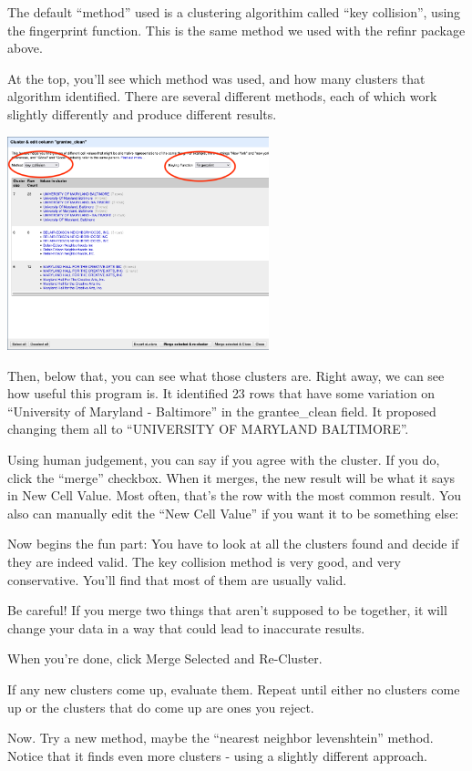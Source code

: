 \documentclass[
  letterpaper,
  DIV=11,
  numbers=noendperiod]{scrreprt}
\begin{document}
The default ``method'' used is a clustering algorithim called ``key
collision'', using the fingerprint function. This is the same method we
used with the refinr package above.

At the top, you'll see which method was used, and how many clusters that
algorithm identified. There are several different methods, each of which
work slightly differently and produce different results.

\includegraphics[width=2.99in,height=\textheight]{./images/open6.png}

Then, below that, you can see what those clusters are. Right away, we
can see how useful this program is. It identified 23 rows that have some
variation on ``University of Maryland - Baltimore'' in the
grantee\_clean field. It proposed changing them all to ``UNIVERSITY OF
MARYLAND BALTIMORE''.

Using human judgement, you can say if you agree with the cluster. If you
do, click the ``merge'' checkbox. When it merges, the new result will be
what it says in New Cell Value. Most often, that's the row with the most
common result. You also can manually edit the ``New Cell Value'' if you
want it to be something else:

Now begins the fun part: You have to look at all the clusters found and
decide if they are indeed valid. The key collision method is very good,
and very conservative. You'll find that most of them are usually valid.

Be careful! If you merge two things that aren't supposed to be together,
it will change your data in a way that could lead to inaccurate results.

When you're done, click Merge Selected and Re-Cluster.

If any new clusters come up, evaluate them. Repeat until either no
clusters come up or the clusters that do come up are ones you reject.

Now. Try a new method, maybe the ``nearest neighbor levenshtein''
method. Notice that it finds even more clusters - using a slightly
different approach.
\end{document}
